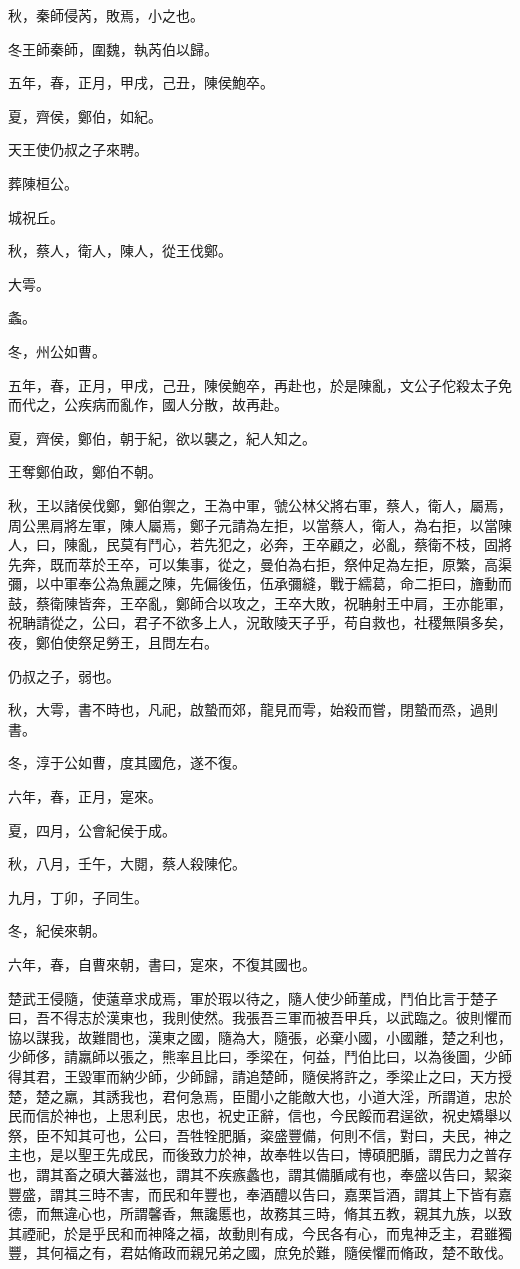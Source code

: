 \begin{pinyinscope}
秋，秦師侵芮，敗焉，小之也。

冬王師秦師，圍魏，執芮伯以歸。

五年，春，正月，甲戌，己丑，陳侯鮑卒。

夏，齊侯，鄭伯，如紀。

天王使仍叔之子來聘。

葬陳桓公。

城祝丘。

秋，蔡人，衛人，陳人，從王伐鄭。

大雩。

螽。

冬，州公如曹。

五年，春，正月，甲戌，己丑，陳侯鮑卒，再赴也，於是陳亂，文公子佗殺太子免而代之，公疾病而亂作，國人分散，故再赴。

夏，齊侯，鄭伯，朝于紀，欲以襲之，紀人知之。

王奪鄭伯政，鄭伯不朝。

秋，王以諸侯伐鄭，鄭伯禦之，王為中軍，虢公林父將右軍，蔡人，衛人，屬焉，周公黑肩將左軍，陳人屬焉，鄭子元請為左拒，以當蔡人，衛人，為右拒，以當陳人，曰，陳亂，民莫有鬥心，若先犯之，必奔，王卒顧之，必亂，蔡衛不枝，固將先奔，既而萃於王卒，可以集事，從之，曼伯為右拒，祭仲足為左拒，原繁，高渠彌，以中軍奉公為魚麗之陳，先偏後伍，伍承彌縫，戰于繻葛，命二拒曰，旝動而鼓，蔡衛陳皆奔，王卒亂，鄭師合以攻之，王卒大敗，祝聃射王中肩，王亦能軍，祝聃請從之，公曰，君子不欲多上人，況敢陵天子乎，苟自救也，社稷無隕多矣，夜，鄭伯使祭足勞王，且問左右。

仍叔之子，弱也。

秋，大雩，書不時也，凡祀，啟蟄而郊，龍見而雩，始殺而嘗，閉蟄而烝，過則書。

冬，淳于公如曹，度其國危，遂不復。

六年，春，正月，寔來。

夏，四月，公會紀侯于成。

秋，八月，壬午，大閱，蔡人殺陳佗。

九月，丁卯，子同生。

冬，紀侯來朝。

六年，春，自曹來朝，書曰，寔來，不復其國也。

楚武王侵隨，使薳章求成焉，軍於瑕以待之，隨人使少師董成，鬥伯比言于楚子曰，吾不得志於漢東也，我則使然。我張吾三軍而被吾甲兵，以武臨之。彼則懼而協以謀我，故難間也，漢東之國，隨為大，隨張，必棄小國，小國離，楚之利也，少師侈，請羸師以張之，熊率且比曰，季梁在，何益，鬥伯比曰，以為後圖，少師得其君，王毀軍而納少師，少師歸，請追楚師，隨侯將許之，季梁止之曰，天方授楚，楚之羸，其誘我也，君何急焉，臣聞小之能敵大也，小道大淫，所謂道，忠於民而信於神也，上思利民，忠也，祝史正辭，信也，今民餒而君逞欲，祝史矯舉以祭，臣不知其可也，公曰，吾牲牷肥腯，粢盛豐備，何則不信，對曰，夫民，神之主也，是以聖王先成民，而後致力於神，故奉牲以告曰，博碩肥腯，謂民力之普存也，謂其畜之碩大蕃滋也，謂其不疾瘯蠡也，謂其備腯咸有也，奉盛以告曰，絜粢豐盛，謂其三時不害，而民和年豐也，奉酒醴以告曰，嘉栗旨酒，謂其上下皆有嘉德，而無違心也，所謂馨香，無讒慝也，故務其三時，脩其五教，親其九族，以致其禋祀，於是乎民和而神降之福，故動則有成，今民各有心，而鬼神乏主，君雖獨豐，其何福之有，君姑脩政而親兄弟之國，庶免於難，隨侯懼而脩政，楚不敢伐。


\end{pinyinscope}
